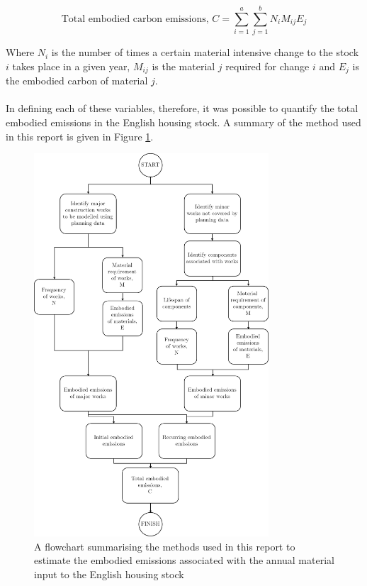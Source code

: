 \documentclass[12pt]{article}
\begin{document}
\begin{equation}
    \text{Total embodied carbon emissions, } C=\sum_{i=1}^{a} \sum_{j=1}^{b} N_i M_{ij} E_j
\end{equation}

\noindent
Where $N_i$ is the number of times a certain material intensive change to the stock $i$ takes place in a given year, $M_{ij}$ is the material $j$ required for change $i$ and $E_j$ is the embodied carbon of material $j$. 

\paragraph{}
In defining each of these variables, therefore, it was possible to quantify the total embodied emissions in the English housing stock. A summary of the method used in this report is given in Figure \ref{fig:flowchart}.

\begin{figure}[!htp]
    \centering
    \includegraphics[width=0.78\textwidth]{Figures/Flowchart3.png}
    \caption{A flowchart summarising the methods used in this report to estimate the embodied emissions associated with the annual material input to the English housing stock}
    \label{fig:flowchart}
\end{figure}
\end{document}
